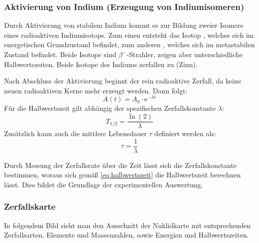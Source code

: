 \subsubsection{Aktivierung von Indium (Erzeugung von Indiumisomeren)}
Durch Aktivierung von stabilem Indium kommt es zur Bildung zweier Isomere eines radioaktiven Indiumisotops. Zum einen entsteht das Isotop , welches sich im energetischen Grundzustand befindet, zum anderen , welches sich im metastabilen Zustand befindet. Beide Isotope sind \(\beta^-\)-Strahler, zeigen aber unterschiedliche Halbwertszeiten. Beide Isotope des Indiums zerfallen zu  (Zinn).

Nach Abschluss der Aktivierung beginnt der rein radioaktive Zerfall, da keine neuen radioaktiven Kerne mehr erzeugt werden. Dann folgt:
\begin{equation} \label{eq:aktivitaet_decay}
    A(t) = A_0 \cdot \mathrm{e}^{-\lambda t}
\end{equation}
Für die Halbwertszeit gilt abhängig der spezifischen Zerfallskonstante \(\lambda\):
\begin{equation} \label{eq:halbwertszeit}
    T_{1/2} = \frac{\ln(2)}{\lambda}
\end{equation}
Zusätzlich kann auch die mittlere Lebensdauer \(\tau\) definiert werden als:
\begin{equation} \label{eq:lebensdauer}
    \tau = \frac{1}{\lambda}
\end{equation}

Durch Messung der Zerfallsrate über die Zeit lässt sich die Zerfallskonstante bestimmen, woraus sich gemäß \cref{eq:halbwertszeit} die Halbwertszeit berechnen lässt. Dies bildet die Grundlage der experimentellen Auswertung.

\subsubsection{Zerfallskarte}
In folgendem Bild sieht man den Ausschnitt der Nuklidkarte mit entsprechenden Zerfallsarten, Elemente und Massenzahlen, sowie Energien und Halbwertszeiten.



